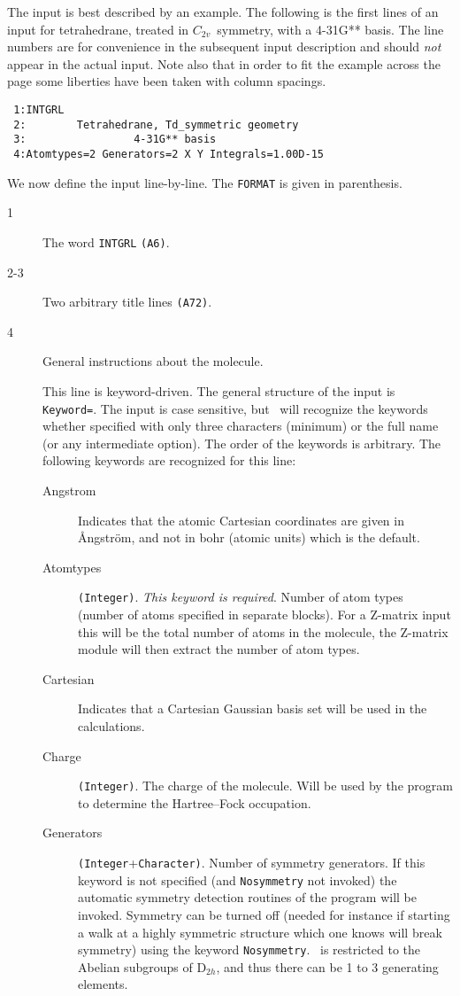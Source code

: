 The input is best described by an example.
The following is the first lines of an input for
tetrahedrane, treated in
$C_{2v}$~symmetry, with a 4-31G** basis.  The line numbers are for
convenience in the subsequent input description and should {\em
not} appear in the actual input.  Note also that in order to fit
the example across the page some liberties have been taken with
column spacings.
\begin{verbatim}
 1:INTGRL
 2:        Tetrahedrane, Td_symmetric geometry
 3:                 4-31G** basis
 4:Atomtypes=2 Generators=2 X Y Integrals=1.00D-15
\end{verbatim}

We now define the input line-by-line.  The {\tt FORMAT} is given
in parenthesis.
\begin{description}
\item[1] The word \verb|INTGRL| {\tt (A6)}.
\item[2-3] Two arbitrary title lines {\tt (A72)}.
\item[4] General instructions about the molecule.

This line is keyword-driven. The general structure of the input is
\verb|Keyword=|. The input is case sensitive, but \dalton\ will recognize
the keywords whether specified with only three characters (minimum) or
the full name (or any intermediate option). The order of the keywords
is arbitrary. The following keywords are recognized for this line:
\begin{description}
\item[Angstrom] Indicates that the atomic Cartesian coordinates are
  given in \AA ngstr\"{o}m, and not in bohr (atomic units) which is
  the default.
\item[Atomtypes] \verb|(Integer)|. {\em This keyword is
  required\/}. Number of atom types (number of atoms specified 
in separate blocks). For a Z-matrix input this will be the total
number of atoms in the molecule, the Z-matrix module will then
extract the number of atom types.
\item[Cartesian] Indicates that a Cartesian Gaussian basis set will be
  used in the calculations.
\item[Charge] \verb|(Integer)|. The charge of the molecule. Will be used  by the program to determine the Hartree--Fock
occupation.
\item[Generators] \verb|(Integer|+\verb|Character)|. Number of symmetry
  generators. If this keyword is not
  specified (and \verb|Nosymmetry| not invoked)
  the automatic symmetry detection routines of the program will be
invoked. Symmetry can be turned off (needed for instance if starting a
walk at a highly symmetric structure which one knows will break
symmetry) using the keyword \verb|Nosymmetry|. \dalton\ is restricted
  to the Abelian subgroups of D$_{2h}$, and thus there can be 1 to 3
  generating elements.


\end{description}
\end{description}
